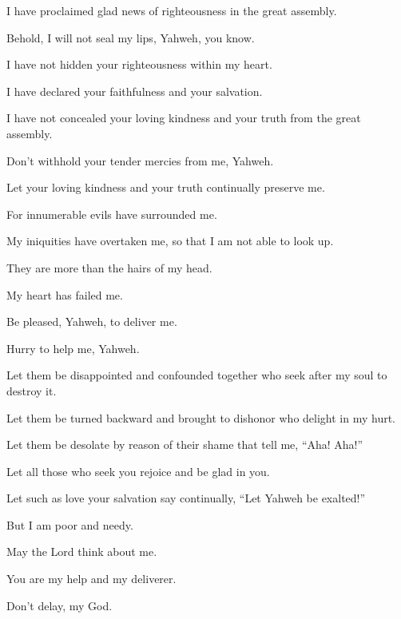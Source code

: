 {\par }{\Q {}I have proclaimed glad news of righteousness in the great assembly.
\par }{\QB Behold, I will not seal my lips, Yahweh, you know.
\par }{\Q {}I have not hidden your righteousness within my heart.
\par }{\QB I have declared your faithfulness and your salvation.
\par }{\QB I have not concealed your loving kindness and your truth from the great assembly.
\par }{\Q {}Don’t withhold your tender mercies from me, Yahweh.
\par }{\QB Let your loving kindness and your truth continually preserve me.
\par }{\Q {}For innumerable evils have surrounded me.
\par }{\QB My iniquities have overtaken me, so that I am not able to look up.
\par }{\Q They are more than the hairs of my head.
\par }{\QB My heart has failed me.
\par }{\Q {}Be pleased, Yahweh, to deliver me.
\par }{\QB Hurry to help me, Yahweh.
\par }{\Q {}Let them be disappointed and confounded together who seek after my soul to destroy it.
\par }{\QB Let them be turned backward and brought to dishonor who delight in my hurt.
\par }{\Q {}Let them be desolate by reason of their shame that tell me, “Aha! Aha!”
\par }{\Q {}Let all those who seek you rejoice and be glad in you.
\par }{\QB Let such as love your salvation say continually, “Let Yahweh be exalted!”
\par }{\Q {}But I am poor and needy.
\par }{\QB May the Lord think about me.
\par }{\Q You are my help and my deliverer.
\par }{\QB Don’t delay, my God.

}
